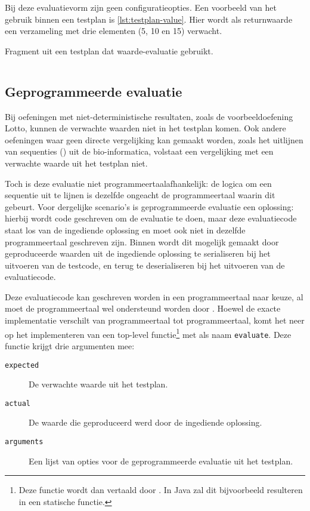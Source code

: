 Bij deze evaluatievorm zijn geen configuratieopties.
Een voorbeeld van het gebruik binnen een testplan is \cref{lst:testplan-value}.
Hier wordt als returnwaarde een verzameling met drie elementen (5, 10 en 15) verwacht.

\begin{listing}[h]
    \caption{Fragment uit een testplan dat waarde-evaluatie gebruikt.}
    \label{lst:testplan-value}
    \inputminted{json}{code/testplan-value.json}
\end{listing}

\subsection{Geprogrammeerde evaluatie}\label{subsec:geprogrammeerde-evaluatie}

Bij oefeningen met niet-deterministische resultaten, zoals de voorbeeldoefening Lotto, kunnen de verwachte waarden niet in het testplan komen.
Ook andere oefeningen waar geen directe vergelijking kan gemaakt worden, zoals het uitlijnen van sequenties () uit de bio-informatica, volstaat een vergelijking met een verwachte waarde uit het testplan niet.

Toch is deze evaluatie niet programmeertaalafhankelijk: de logica om een sequentie uit te lijnen is dezelfde ongeacht de programmeertaal waarin dit gebeurt.
Voor dergelijke scenario's is geprogrammeerde evaluatie een oplossing: hierbij wordt code geschreven om de evaluatie te doen, maar deze evaluatiecode staat los van de ingediende oplossing en moet ook niet in dezelfde programmeertaal geschreven zijn.
Binnen \tested{} wordt dit mogelijk gemaakt door geproduceerde waarden uit de ingediende oplossing te serialiseren bij het uitvoeren van de testcode, en terug te deserialiseren bij het uitvoeren van de evaluatiecode.

Deze evaluatiecode kan geschreven worden in een programmeertaal naar keuze, al moet de programmeertaal wel ondersteund worden door \tested{}.
Hoewel de exacte implementatie verschilt van programmeertaal tot programmeertaal, komt het neer op het implementeren van een top-level functie\footnote{
    Deze functie wordt dan vertaald door \tested{}.
    In Java zal dit bijvoorbeeld resulteren in een statische functie.
} met als naam \texttt{evaluate}.
Deze functie krijgt drie argumenten mee:

\begin{description}
    \item[\texttt{expected}] De verwachte waarde uit het testplan.
    \item[\texttt{actual}] De waarde die geproduceerd werd door de ingediende oplossing.
    \item[\texttt{arguments}] Een lijst van opties voor de geprogrammeerde evaluatie uit het testplan.
\end{description}

